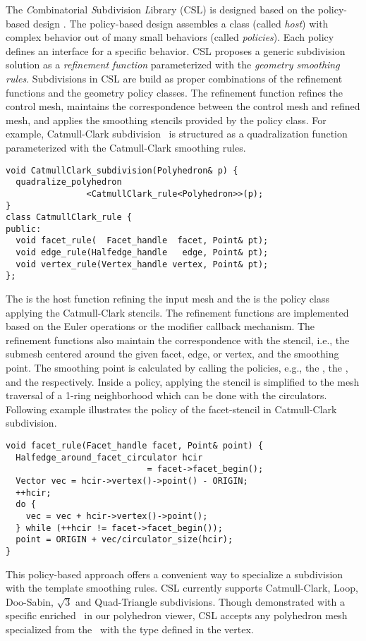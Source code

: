 The \emph{C}ombinatorial \emph{S}ubdivision \emph{L}ibrary 
(CSL) is designed based on the policy-based design 
\cite{Alexandrescu:2001:MCD}.
The policy-based design assembles a class
(called \emph{host}) with complex behavior out of many 
small behaviors (called \emph{policies}).
Each policy defines an interface for a
specific behavior. CSL proposes a 
generic subdivision solution as a \emph{refinement function}
parameterized with the \emph{geometry smoothing rules}.
Subdivisions in CSL are build as proper combinations of the
refinement functions and the geometry policy classes.
The refinement function refines the control mesh,
maintains the correspondence between the control mesh and refined
mesh, and applies the smoothing stencils provided by the policy
class. For example, Catmull-Clark subdivision~\cite{cc} is structured
as a quadralization function parameterized with the Catmull-Clark
smoothing rules.


\begin{lstlisting}
void CatmullClark_subdivision(Polyhedron& p) {    
  quadralize_polyhedron
                <CatmullClark_rule<Polyhedron>>(p);  
}
class CatmullClark_rule {
public:
  void facet_rule(  Facet_handle  facet, Point& pt);
  void edge_rule(Halfedge_handle   edge, Point& pt);
  void vertex_rule(Vertex_handle vertex, Point& pt);
};
\end{lstlisting}
\noindent The  
is the host function refining the input mesh
and the  is the policy 
class applying the Catmull-Clark stencils.
The refinement functions are implemented based on the
Euler operations or the modifier callback mechanism.
The refinement functions also maintain the 
correspondence with the stencil, i.e., the submesh 
centered around the given facet, edge, or
vertex, and the smoothing point.
The smoothing point is calculated by calling the 
policies, e.g., the , the 
, and the  
respectively. Inside a policy, applying the 
stencil is simplified to the mesh traversal of a 
1-ring neighborhood which can be done with the 
circulators. Following example illustrates  
the policy of the facet-stencil in Catmull-Clark 
subdivision.
\begin{lstlisting}
void facet_rule(Facet_handle facet, Point& point) {
  Halfedge_around_facet_circulator hcir 
                            = facet->facet_begin();
  Vector vec = hcir->vertex()->point() - ORIGIN;
  ++hcir;
  do {
    vec = vec + hcir->vertex()->point();
  } while (++hcir != facet->facet_begin());
  point = ORIGIN + vec/circulator_size(hcir);
}
\end{lstlisting}

This policy-based approach offers a convenient way to
specialize a subdivision with the template smoothing rules.
CSL currently supports Catmull-Clark, 
Loop, Doo-Sabin, $\sqrt{3}$ and Quad-Triangle
subdivisions. %
Though demonstrated with a specific enriched \poly\ in our 
polyhedron viewer, CSL accepts any polyhedron mesh specialized 
from the \poly\ with the  type defined in the vertex.  
